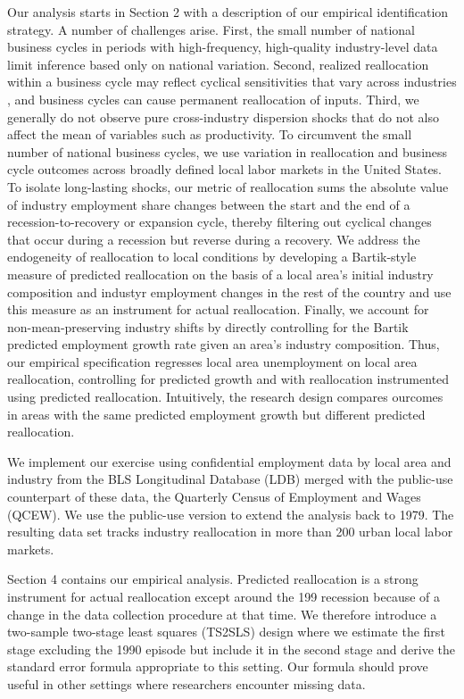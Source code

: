 \documentclass[12pt]{article}
\theoremstyle{definition}
\begin{document}
Our analysis starts in Section 2 with a description of our empirical identification strategy. A number of challenges arise. First, the small number of national business cycles in periods with high-frequency, high-quality industry-level data limit inference based only on national variation. Second, realized reallocation within a business cycle may reflect cyclical sensitivities that vary across industries \citep{abrahamCyclicalUnemploymentSectoral1986}, and business cycles can cause permanent reallocation of inputs. Third, we generally do not observe pure cross-industry dispersion shocks that do not also affect the mean of variables such as productivity. To circumvent the small number of national business cycles, we use variation in reallocation and business cycle outcomes across broadly defined local labor markets in the United States. To isolate long-lasting shocks, our metric of reallocation sums the absolute value of industry employment share changes between the start and the end of a recession-to-recovery or expansion cycle, thereby filtering out cyclical changes that occur during a recession but reverse during a recovery. We address the endogeneity of reallocation to local conditions by developing a Bartik-style measure of predicted reallocation on the basis of a local area's initial industry composition and industyr employment changes in the rest of the country and use this measure as an instrument for actual reallocation. Finally, we account for non-mean-preserving industry shifts by directly controlling for the Bartik predicted employment growth rate given an area's industry composition. Thus, our empirical specification regresses local area unemployment on local area reallocation, controlling for predicted growth and with reallocation instrumented using predicted reallocation. Intuitively, the research design compares ourcomes in areas with the same predicted employment growth but different predicted reallocation.

We implement our exercise using confidential employment data by local area and industry from the BLS Longitudinal Database (LDB) merged with the public-use counterpart of these data, the Quarterly Census of Employment and Wages (QCEW). We use the public-use version to extend the analysis back to 1979. The resulting data set tracks industry reallocation in more than 200 urban local labor markets.

Section 4 contains our empirical analysis. Predicted reallocation is a strong instrument for actual reallocation except around the 199 recession because of a change in the data collection procedure at that time. We therefore introduce a two-sample two-stage least squares (TS2SLS) design where we estimate the first stage excluding the 1990 episode but include it in the second stage and derive the standard error formula appropriate to this setting. Our formula should prove useful in other settings where researchers encounter missing data. 
\end{document}
